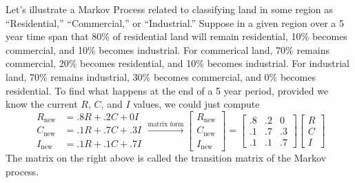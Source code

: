 \begin{example} Let's illustrate a Markov Process related to classifying land in some region as ``Residential,'' ``Commercial,'' or ``Industrial.'' Suppose in a given region over a 5 year time span that 80\% of residential land will remain residential, 10\% becomes commercial, and 10\%  becomes industrial.  For commerical land, 70\% remains commercial, 20\% becomes residential, and 10\% becomes industrial.  For industrial land, 70\% remains industrial, 30\% becomes commercial, and 0\% becomes residential.  To find what happens at the end of a 5 year period, provided we know the current $R$, $C$, and $I$ values, we could just compute 
$$
\begin{array}{rl}
R_{\text{new}} &= .8 R+ .2 C+0 I\\ 
C_{\text{new}} &= .1 R+ .7 C+.3 I\\ 
I_{\text{new}} &= .1 R+ .1 C+.7 I 
\end{array}
\xrightarrow{\text{matrix form}}
\begin{bmatrix}
R_{\text{new}}\\ 
C_{\text{new}}\\ 
I_{\text{new}} 
\end{bmatrix}
=
\begin{bmatrix}
.8& .2 &0 \\ 
.1& .7 &.3\\ 
.1& .1 &.7 
\end{bmatrix}
\begin{bmatrix}
R\\ 
C\\ 
I 
\end{bmatrix}
$$
The matrix on the right above is called the transition matrix of the Markov process. 
\end{example}
